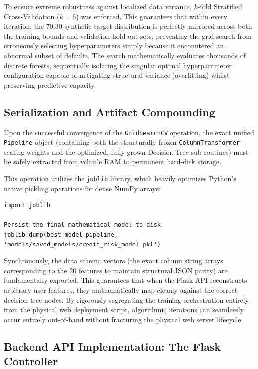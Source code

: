 To ensure extreme robustness against localized data variance, \(k\)-fold
Stratified Cross-Validation (\(k=5\)) was enforced. This guarantees that
within every iteration, the 70:30 synthetic target distribution is
perfectly mirrored across both the training bounds and validation
hold-out sets, preventing the grid search from erroneously selecting
hyperparameters simply because it encountered an abnormal subset of
defaults. The search mathematically evaluates thousands of discrete
forests, sequentially isolating the singular optimal hyperparameter
configuration capable of mitigating structural variance (overfitting)
whilst preserving predictive capacity.

\hypertarget{serialization-and-artifact-compounding}{%
\subsection{Serialization and Artifact
Compounding}\label{serialization-and-artifact-compounding}}

Upon the successful convergence of the \texttt{GridSearchCV} operation,
the exact unified \texttt{Pipeline} object (containing both the
structurally frozen \texttt{ColumnTransformer} scaling weights and the
optimized, fully-grown Decision Tree sub-routines) must be safely
extracted from volatile RAM to permanent hard-disk storage.

This operation utilizes the \texttt{joblib} library, which heavily
optimizes Python's native pickling operations for dense NumPy arrays:

\begin{verbatim}
import joblib

Persist the final mathematical model to disk
joblib.dump(best_model_pipeline, 'models/saved_models/credit_risk_model.pkl')
\end{verbatim}

Synchronously, the data schema vectors (the exact column string arrays
corresponding to the 20 features to maintain structural JSON parity) are
fundamentally exported. This guarantees that when the Flask API
reconstructs arbitrary user features, they mathematically map cleanly
against the correct decision tree nodes. By rigorously segregating the
training orchestration entirely from the physical web deployment script,
algorithmic iterations can seamlessly occur entirely out-of-band without
fracturing the physical web server lifecycle.

\hypertarget{backend-api-implementation-the-flask-controller}{%
\subsection{Backend API Implementation: The Flask
Controller}\label{backend-api-implementation-the-flask-controller}}

